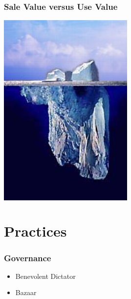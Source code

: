 \documentclass[18pt]{beamer}
\begin{document}
\begin{frame}[plain]
\frametitle{Sale Value versus Use Value}
  \includegraphics[width=0.5\textwidth,height=\paperheight]{../Art/Iceberg.jpg}
\end{frame}


{
\begin{frame}[plain]
\end{frame}
}

\section{Practices}

\begin{frame}
\frametitle{Governance}
\begin{itemize}
\item Benevolent Dictator
\pause
\item Bazaar
\end{itemize}
\end{frame}
\end{document}
